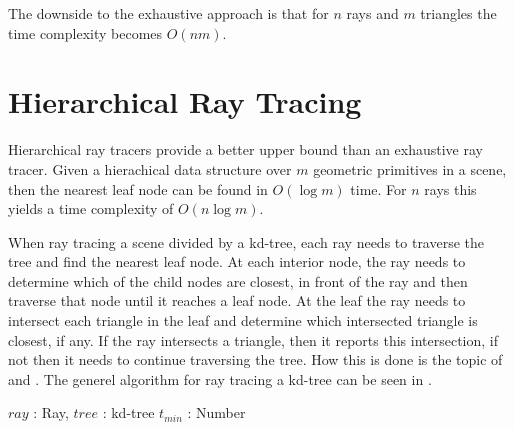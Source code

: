 The downside to the exhaustive approach is that for $n$ rays and $m$
triangles the time complexity becomes $O(nm)$.

\section{Hierarchical Ray Tracing}


Hierarchical ray tracers provide a better upper bound than an
exhaustive ray tracer. Given a hierachical data structure over $m$
geometric primitives in a scene, then the nearest leaf node can be
found in $O(\log m)$ time. For $n$ rays this yields a time complexity
of $O(n \log m)$.


When ray tracing a scene divided by a kd-tree, each ray needs to
traverse the tree and find the nearest leaf node. At each interior
node, the ray needs to determine which of the child nodes are closest,
in front of the ray and then traverse that node until it reaches a
leaf node. At the leaf the ray needs to intersect each triangle in the
leaf and determine which intersected triangle is closest, if any. If
the ray intersects a triangle, then it reports this intersection, if
not then it needs to continue traversing the tree. How this is done is
the topic of  and
. The generel algorithm for ray tracing a
kd-tree can be seen in .

\begin{algorithm}
  \caption{A general kd-tree ray tracing algorithm}
  \label{alg:generelTracing}
  \begin{algorithmic}
              {$ray$ : Ray, $tree$ : kd-tree}
              {$t_{min}$ : Number}{
                  \ELSE
                  \ENDIF
                \ENDWHILE
              }
  \end{algorithmic}
\end{algorithm}

